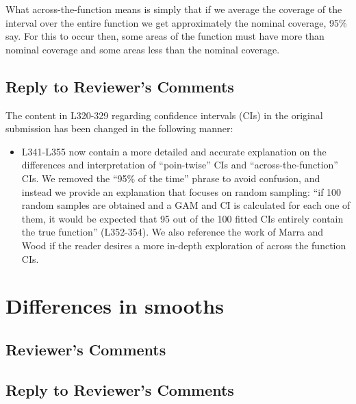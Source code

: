 \documentclass[
]{article}
\providecommand{\tightlist}{%
  \setlength{\itemsep}{0pt}\setlength{\parskip}{0pt}}
\begin{document}
What across-the-function means is simply that if we average the coverage of the interval over the entire function we get approximately the nominal coverage, 95\% say. For this to occur then, some areas of the function must have more
than nominal coverage and some areas less than the nominal coverage.

\hypertarget{section-6}{%
\subsection{\texorpdfstring{\textcolor{reviewersblue} {Reply to Reviewer's Comments}}{}}\label{section-6}}

The content in L320-329 regarding confidence intervals (CIs) in the original submission has been changed in the following manner:

\begin{itemize}
\tightlist
\item
  L341-L355 now contain a more detailed and accurate explanation on the differences and interpretation of ``poin-twise'' CIs and ``across-the-function'' CIs. We removed the ``95\% of the time'' phrase to avoid confusion, and instead we provide an explanation that focuses on random sampling: ``if 100 random samples are obtained and a GAM and CI is calculated for each one of them, it would be expected that 95 out of the 100 fitted CIs entirely contain the true function'' (L352-354). We also reference the work of Marra and Wood if the reader desires a more in-depth exploration of across the function CIs.
\end{itemize}

\hypertarget{differences-in-smooths}{%
\section{Differences in smooths}\label{differences-in-smooths}}

\hypertarget{reviewers-comments-7}{%
\subsection{Reviewer's Comments}\label{reviewers-comments-7}}

\hypertarget{section-7}{%
\subsection{\texorpdfstring{\textcolor{reviewersblue} {Reply to Reviewer's Comments}}{}}\label{section-7}}
\end{document}
